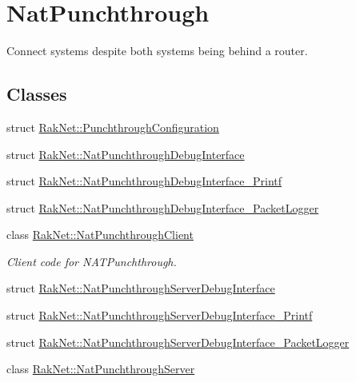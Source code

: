 \hypertarget{group___n_a_t___p_u_n_c_h_t_h_r_o_u_g_h___g_r_o_u_p}{\section{Nat\-Punchthrough}
\label{group___n_a_t___p_u_n_c_h_t_h_r_o_u_g_h___g_r_o_u_p}
}


Connect systems despite both systems being behind a router.  


\subsection*{Classes}
\begin{DoxyCompactItemize}
\item 
struct \hyperlink{struct_rak_net_1_1_punchthrough_configuration}{Rak\-Net\-::\-Punchthrough\-Configuration}
\item 
struct \hyperlink{struct_rak_net_1_1_nat_punchthrough_debug_interface}{Rak\-Net\-::\-Nat\-Punchthrough\-Debug\-Interface}
\item 
struct \hyperlink{struct_rak_net_1_1_nat_punchthrough_debug_interface___printf}{Rak\-Net\-::\-Nat\-Punchthrough\-Debug\-Interface\-\_\-\-Printf}
\item 
struct \hyperlink{struct_rak_net_1_1_nat_punchthrough_debug_interface___packet_logger}{Rak\-Net\-::\-Nat\-Punchthrough\-Debug\-Interface\-\_\-\-Packet\-Logger}
\item 
class \hyperlink{class_rak_net_1_1_nat_punchthrough_client}{Rak\-Net\-::\-Nat\-Punchthrough\-Client}
\begin{DoxyCompactList}\small\item\em Client code for N\-A\-T\-Punchthrough. \end{DoxyCompactList}\item 
struct \hyperlink{struct_rak_net_1_1_nat_punchthrough_server_debug_interface}{Rak\-Net\-::\-Nat\-Punchthrough\-Server\-Debug\-Interface}
\item 
struct \hyperlink{struct_rak_net_1_1_nat_punchthrough_server_debug_interface___printf}{Rak\-Net\-::\-Nat\-Punchthrough\-Server\-Debug\-Interface\-\_\-\-Printf}
\item 
struct \hyperlink{struct_rak_net_1_1_nat_punchthrough_server_debug_interface___packet_logger}{Rak\-Net\-::\-Nat\-Punchthrough\-Server\-Debug\-Interface\-\_\-\-Packet\-Logger}
\item 
class \hyperlink{class_rak_net_1_1_nat_punchthrough_server}{Rak\-Net\-::\-Nat\-Punchthrough\-Server}

\end{DoxyCompactItemize}
